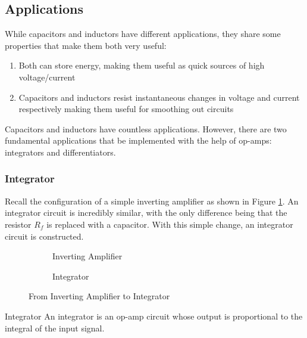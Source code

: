 \documentclass[12pt]{article}
\begin{document}
\subsection{Applications}
\label{ssec:applicationsOfCapacitorsAndInductors}

While capacitors and inductors have different applications, they share some properties that make them both very useful:
\begin{enumerate}
  \itemsep0em
  \item Both can store energy, making them useful as quick sources of high voltage/current
  \item Capacitors and inductors resist instantaneous changes in voltage and current respectively making them useful for smoothing out circuits
\end{enumerate}
Capacitors and inductors have countless applications. However, there are two fundamental applications that be implemented with the help of op-amps: integrators and differentiators.

\subsubsection{Integrator}
\label{sssec:integrator}

Recall the configuration of a simple inverting amplifier as shown in Figure \ref{fig:017}. An integrator circuit is incredibly similar, with the only difference being that the resistor $R_f$ is replaced with a capacitor. With this simple change, an integrator circuit is constructed.

\begin{figure}[H]
  \centering
  \begin{subfigure}[H]{0.45\textwidth}
    \centering
    
    \caption{Inverting Amplifier}
    \label{fig:017}
  \end{subfigure}
  \begin{subfigure}[H]{0.45\textwidth}
    \centering
    
    \caption{Integrator}
    \label{fig:018}
  \end{subfigure}
  \caption{From Inverting Amplifier to Integrator}
  \label{fig:fromInvertingAmplifierToIntegrator}
\end{figure}

\begin{definition}{Integrator}
  An integrator is an op-amp circuit whose output is proportional to the integral of the input signal.
\end{definition}
\end{document}
